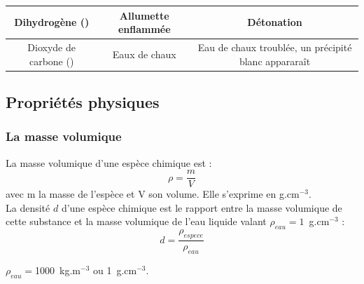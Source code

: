 \begin{tcolorbox}[colback=red!5!white,colframe=red!75!black,title=\textbf{Tests chimiques à connaître : }]
\begin{tabular}{|C{0.31}|C{0.3}|C{0.31}|}

    Dihydrogène () & Allumette enflammée  &  Détonation \\
    \hline 
    Dioxyde de carbone () & Eaux de chaux & Eau de chaux troublée, un précipité blanc appararaît \\
    \hline
    \end{tabular}
\end{tcolorbox} 

\subsection{Propriétés physiques}
\subsubsection{La masse volumique}
\begin{tcolorbox}[colback=green!5!white,colframe=green!75!black,title=\textbf{Rappel : masse volumique et densité }]
La masse volumique d'une espèce chimique est :
\begin{equation*}
    \rho = \frac{m}{V}
\end{equation*}
avec m la masse de l'espèce et V son volume. Elle s'exprime en g.cm$^{-3}$.\\
La densité $d$ d'une espèce chimique est le rapport entre la masse volumique de cette substance et la masse volumique de l'eau liquide valant $\rho_{eau}=1$~g.cm$^{-3}$ :
\begin{equation*}
    d = \frac{\rho_{espece}}{\rho_{eau}}
\end{equation*}
\end{tcolorbox}

\begin{tcolorbox}[colback=red!5!white,colframe=red!75!black,title=\textbf{Masse volumique de l'eau: }]
\begin{center}
    $\rho_{eau} = $1000~kg.m$^{-3}$ ou 1~g.cm$^{-3}$. 
\end{center}
\end{tcolorbox}

